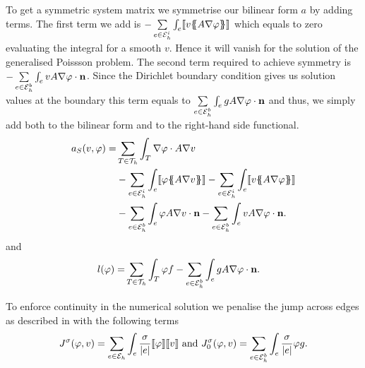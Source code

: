 \begin{definition} 
To get a symmetric system matrix we symmetrise our bilinear form $a$ by adding terms. 
The first term we add is  $- \sum\limits_{e \in \mathcal{E}_h^i}\int_{e} \llbracket  v \{\!\!\{  A \nabla \varphi \}\!\!\} \rrbracket$ which equals to zero evaluating the integral for a smooth $v$. Hence it will vanish for the solution of the generalised Poissson problem. The second term required to achieve symmetry is  $-\sum\limits_{e \in \mathcal{E}_h^b}\int_{e} v A \nabla \varphi \cdot \mathbf n$. Since the Dirichlet boundary condition gives us solution values at the boundary this term equals to $\sum\limits_{e \in \mathcal{E}_h^b}\int_{e} g A \nabla \varphi \cdot \mathbf n$ and thus, we simply add both to the bilinear form and to the right-hand side functional.
\begin{align}
 a_S(v, \varphi) = &\sum\limits_{T \in \triang} \int_T \nabla \varphi \cdot A \nabla v \nonumber \\
  &-\sum\limits_{e \in \edgesi}\int_{e} \jump {\varphi \average{A \nabla v} }
 - \sum\limits_{e \in \edgesi}\int_{e} \jump{ v \average{ A \nabla \varphi}} \nonumber\\ 
 & - \sum\limits_{e \in \edgesb}\int_{e} \varphi A \nabla v \cdot \mathbf n 
    - \sum\limits_{e \in \edgesb}\int_{e} v A \nabla \varphi \cdot \mathbf n. \label{eq:inner product SIPG}
\end{align}
and 
\begin{align}
	l(\varphi) =& \sum\limits_{T \in \mathcal{T}_h} \int_T \varphi f -\sum\limits_{e \in \mathcal{E}_h^b}\int_{e} g A \nabla \varphi \cdot \mathbf n.
\end{align} 


To enforce continuity in the numerical solution we penalise the jump across edges as described in  \cite[3.2.2.]{PPO+2000} with the following terms
\begin{align}
	J^\sigma(\varphi, v) = \sum\limits_{e \in \mathcal{E}_h} \int_e \frac \sigma {|e|} \llbracket \varphi \rrbracket \llbracket v \rrbracket \textnormal{ and } 	J^\sigma_0(\varphi, v) = \sum\limits_{e \in \mathcal{E}_h^b} \int_e \frac \sigma {|e|} \varphi g .
\end{align}


\end{definition}
